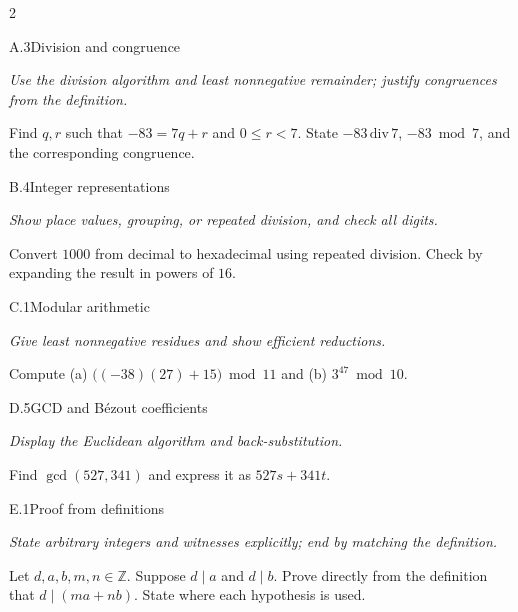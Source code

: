 \documentclass[9pt]{extarticle}
\begin{document}
\begin{multicols}{2}
\begin{CoreProblem}{A.3}{Division and congruence}
{\scriptsize\textit{Use the division algorithm and least nonnegative remainder; justify congruences from the definition.}\par}
Find $q,r$ such that $-83=7q+r$ and $0\le r<7$. State
$-83\,\mathrm{div}\,7$, $-83\bmod7$, and the corresponding congruence.
\end{CoreProblem}
\begin{CoreProblem}{B.4}{Integer representations}
{\scriptsize\textit{Show place values, grouping, or repeated division, and check all digits.}\par}
Convert $1000$ from decimal to hexadecimal using repeated division. Check by
expanding the result in powers of $16$.
\end{CoreProblem}
\begin{CoreProblem}{C.1}{Modular arithmetic}
{\scriptsize\textit{Give least nonnegative residues and show efficient reductions.}\par}
Compute (a) $\bigl((-38)(27)+15\bigr)\bmod11$ and
(b) $3^{47}\bmod10$.
\end{CoreProblem}
\columnbreak
\begin{CoreProblem}{D.5}{GCD and B\'ezout coefficients}
{\scriptsize\textit{Display the Euclidean algorithm and back-substitution.}\par}
Find $\gcd(527,341)$ and express it as $527s+341t$.
\end{CoreProblem}
\begin{CoreProblem}{E.1}{Proof from definitions}
{\scriptsize\textit{State arbitrary integers and witnesses explicitly; end by matching the definition.}\par}
Let $d,a,b,m,n\in\mathbb Z$. Suppose $d\mid a$ and $d\mid b$. Prove directly
from the definition that $d\mid(ma+nb)$. State where each hypothesis is used.
\end{CoreProblem}
\end{multicols}
\CoreWorkArea
\FormBreak
{}
\end{document}
